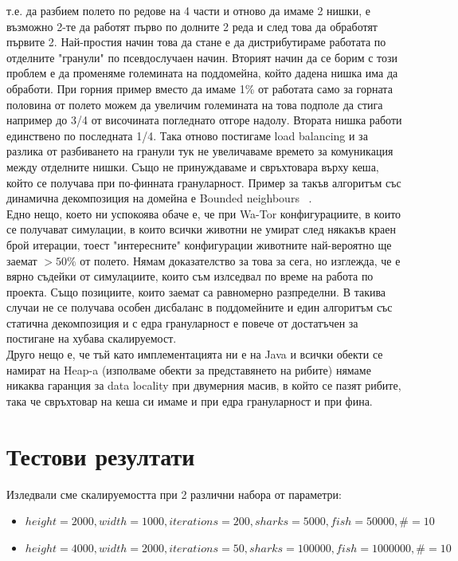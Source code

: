 \documentclass[12pt]{article}
\begin{document}
т.е. да разбием полето по редове на 4 части и отново да имаме 2 нишки, е възможно 2-те да работят първо по долните 2
реда и след това да обработят първите 2. Най-простия начин това да стане е да дистрибутираме
работата по отделните "гранули" по псевдослучаен начин. Вторият начин да се борим с този проблем е да променяме големината
на поддомейна, който дадена нишка има да обработи. При горния пример вместо да имаме 1\% от работата само за
горната половина от полето можем да увеличим големината на това подполе да стига например до 3/4 от височината погледнато
отгоре надолу. Втората нишка работи единствено по последната 1/4. Така отново постигаме load balancing и за разлика
от разбиването на гранули тук не увеличаваме времето за комуникация между отделните нишки. Също не принуждаваме
и свръхтовара върху кеша, който се получава при по-финната грануларност. Пример за такъв алгоритъм със динамична
декомпозиция на домейна е Bounded neighbours ~\cite{bounded_neighbours}.
\\
Едно нещо, което ни успокоява обаче е, че при Wa-Tor конфигурациите, в които се получават симулации, в които всички животни
не умират след някакъв краен брой итерации, тоест "интересните" конфигурации животните най-вероятно ще заемат $> 50\%$ от полето.
Нямам доказателство за това за сега, но изглежда, че е вярно съдейки от симулациите, които съм излседвал по време на работа
по проекта. Също позициите, които заемат са равномерно разпределни. В такива случаи не се получава особен дисбаланс в поддомейните
и един алгоритъм със статична декомпозиция и с едра грануларност е повече от достатъчен за постигане на хубава скалируемост.
\\
Друго нещо е, че тъй като имплементацията ни е на Java и всички обекти се намират на Heap-a (изполваме обекти за представянето
на рибите) нямаме никаква гаранция за data locality при двумерния масив, в който се пазят рибите, така че свръхтовар
на кеша си имаме и при едра грануларност и при фина.

\section{Тестови резултати}

\bigbreak
Изледвали сме скалируемостта при 2 различни набора от параметри:
\begin{itemize}
	\item $height = 2000, width = 1000, iterations = 200, sharks = 5000, fish = 50 000, \# = 10$
	\item $height = 4000, width = 2000, iterations = 50, sharks = 100 000, fish = 1 000 000, \# = 10$
\end{itemize}
\end{document}
